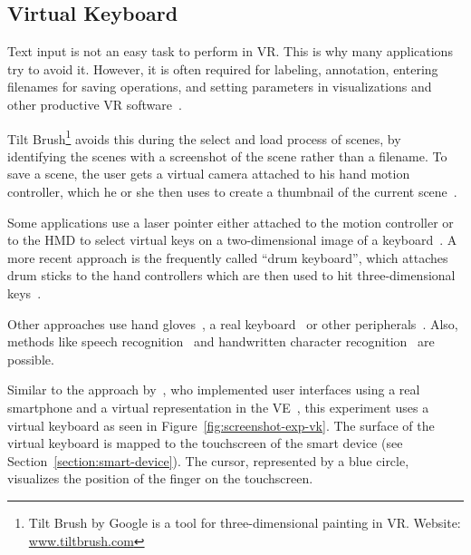 \subsection{Virtual Keyboard}\label{subsection:virtual-keyboard}

Text input is not an easy task to perform in \gls{VR}. This is why many applications try to avoid it. However, it is often required for labeling, annotation, entering filenames for saving operations, and setting parameters in visualizations and other productive \gls{VR} software~\cite[2154]{Rhoton.2002}. 

Tilt Brush\footnote{Tilt Brush by Google is a tool for three-dimensional painting in VR. Website: \href{https://www.tiltbrush.com/}{www.tiltbrush.com}} avoids this during the select and load process of scenes, by identifying the scenes with a screenshot of the scene rather than a filename. To save a scene, the user gets a virtual camera attached to his hand motion controller, which he or she then uses to create a thumbnail of the current scene~\cite{GoogleLLC.2019}. %

Some applications use a laser pointer either attached to the motion controller or to the \gls{HMD} to select virtual keys on a two-dimensional image of a keyboard~\cite{WeelcoInc.2017}. A more recent approach is the frequently called \enquote{drum keyboard}, which attaches drum sticks to the hand controllers which are then used to hit three-dimensional keys~\cite{Weisel.2017}.

Other approaches use hand gloves~\cite{Evans.1999,Rhoton.2002}, a real keyboard~\cite{McGill.2015,Walker.2017} or other peripherals~\cite[111\psq]{Gonzalez.2009}. Also, methods like speech recognition~\cite[2154\psqq]{Rhoton.2002} and handwritten character recognition~\cite[113]{Gonzalez.2009} are possible.

Similar to the approach by~\citeauthor{Dias.2018}, who implemented user interfaces using a real smartphone and a virtual representation in the \gls{VE}~\cite[5]{Dias.2018}, this experiment uses a virtual keyboard as seen in Figure~\ref{fig:screenshot-exp-vk}.
The surface of the virtual keyboard is mapped to the touchscreen of the smart device (see Section~\ref{section:smart-device}). The cursor, represented by a blue circle, visualizes the position of the finger on the touchscreen.


